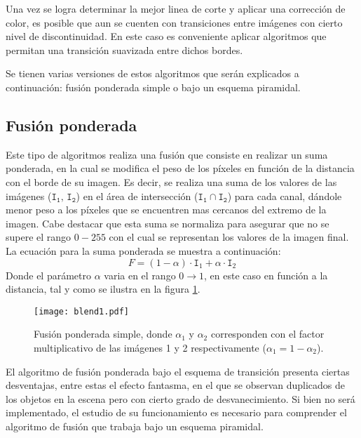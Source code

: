 Una vez se logra determinar la mejor linea de corte y aplicar una corrección de color, es posible que aun se cuenten con transiciones entre imágenes con cierto nivel de discontinuidad. En este caso es conveniente aplicar algoritmos que permitan una transición suavizada entre dichos bordes.

Se tienen varias versiones de estos algoritmos que serán explicados a continuación: fusión ponderada simple o bajo un esquema piramidal.

\subsection{Fusión ponderada} \label{feathering}
Este tipo de algoritmos realiza una fusión que consiste en realizar un suma ponderada, en la cual se modifica el peso de los píxeles en función de la distancia con el borde de su imagen. Es decir, se realiza una suma de los valores de las imágenes ($\mathtt{I_1},\, \mathtt{I_2}$) en el área de intersección ($\mathtt{I_1}\cap \mathtt{I_2}$) para cada canal, dándole menor peso a los píxeles que se encuentren mas cercanos del extremo de la imagen. Cabe destacar que esta suma se normaliza para asegurar que no se supere el rango $0-255$ con el cual se representan los valores de la imagen final. La ecuación para la suma ponderada se muestra a continuación:
\begin{displaymath}
	F = (1-\alpha)\cdot \mathtt{I}_1 + \alpha\cdot \mathtt{I}_2
\end{displaymath} 
Donde el parámetro $\alpha$ varia en el rango $0\to 1$, en este caso en función a la distancia, tal y como se ilustra en la figura \ref{imagen:blend-simple}.


\begin{figure}[h]
	\centering
	\texttt{[image: blend1.pdf]}
	\caption[Fusión ponderada simple]{Fusión ponderada simple, donde $\alpha_1$ y $\alpha_2$ corresponden con el factor multiplicativo de las imágenes 1 y 2 respectivamente ($\alpha_1 = 1 - \alpha_2$).}
	\label{imagen:blend-simple}
\end{figure}

El algoritmo de fusión ponderada bajo el esquema de transición presenta ciertas desventajas, entre estas el efecto fantasma, en el que se observan duplicados de los objetos en la escena pero con cierto grado de desvanecimiento. Si bien no será implementado, el estudio de su funcionamiento es necesario para comprender el algoritmo de fusión que trabaja bajo un esquema piramidal.

